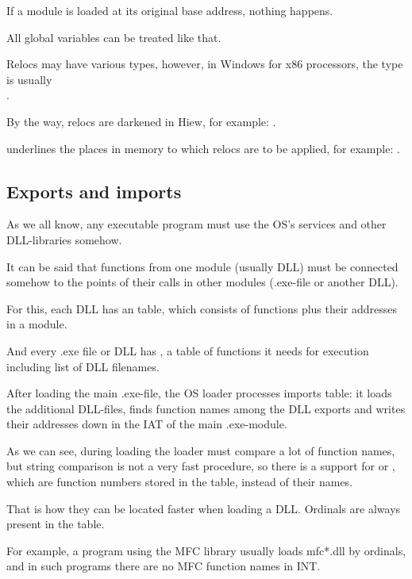 If a module is loaded at its original base address, nothing happens.

All global variables can be treated like that.

Relocs may have various types, however, in Windows for x86 processors, the type is usually \\
.


By the way, relocs are darkened in Hiew, for example: .

\myindex{\olly}
\olly underlines the places in memory to which relocs are to be applied, for example: .

\subsection{Exports and imports}

\label{PE_exports_imports}
As we all know, any executable program must use the \ac{OS}'s services and other DLL-libraries somehow.

It can be said that functions from one module (usually DLL) must be connected somehow to the points of their
calls in other modules (.exe-file or another DLL).

For this, each DLL has an  table, which consists of functions plus their addresses in a module.

And every .exe file or DLL has , a table of functions it needs for execution including
list of DLL filenames.

After loading the main .exe-file, the \ac{OS} loader processes imports table: 
it loads the additional DLL-files, finds function names
among the DLL exports and writes their addresses down in the \ac{IAT} of the main .exe-module.


As we can see, during loading the loader must compare a lot of function names, but string comparison is not a very
fast procedure, so there is a support for  or ,
which are function numbers stored in the table, instead of their names.

That is how they can be located faster when loading a DLL.
Ordinals are always present in the  table.

For example, a program using the \ac{MFC} library usually loads mfc*.dll by ordinals,
and in such programs there are no \ac{MFC} function names in \ac{INT}.

